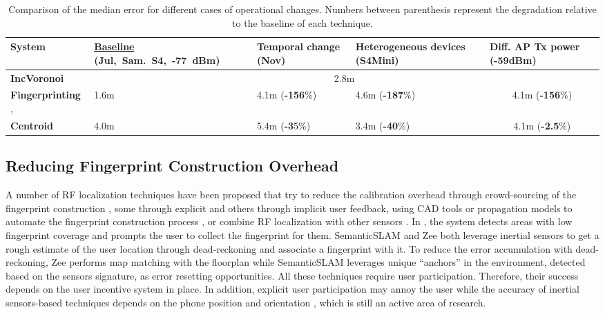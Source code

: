 \documentclass[conference]{IEEEtran}
\begin{document}
\begin{table*}[!t]
\centering
\begin{tabular}{|l|p{1.55in}||p{1.2in}|p{1.5in}|p{0.9in}|} \hline
\textbf{System}&\centering \textbf{\normalsize{\underline{Baseline}} \mbox{\small (Jul, Sam. S4, -77 dBm)}}&\centering  \textbf{Temporal change (Nov)}&\centering \textbf{Heterogeneous devices (S4Mini)}& \textbf{Diff. AP Tx power \mbox{\hspace{7mm}(-59dBm)}}\\ \hline \hline
\textbf{IncVoronoi}&\multicolumn{4}{c|}{2.8m}\\ \hline
\textbf{Fingerprinting} \cite{youssef2005horus},\cite{7103024}&\centering 1.6m&\centering  4.1m (\textbf{\textbf{-156}}\%)&\centering  4.6m (\textbf{\textbf{-187}}\%)&\multicolumn{1}{c|}{4.1m (\textbf{-156}\%)}\\ \hline
\textbf{Centroid} \cite{blumenthal2007weighted}&\centering 4.0m&\centering 5.4m (\textbf{-3}5\%)&\centering 3.4m (\textbf{-40}\%)&\multicolumn{1}{c|}{4.1m (\textbf{-2.5}\%)}\\ \hline
\end{tabular}
\caption{Comparison of the median error for different cases of operational changes. Numbers between parenthesis represent the degradation relative to the baseline of each technique.}
\label{tab:cdfTimeComp}
\end{table*}

\subsection{Reducing Fingerprint Construction Overhead}
A number of RF localization techniques have been proposed that try to reduce the calibration overhead through crowd-sourcing of the fingerprint construction \cite{abdelnassersemanticslam,elhamshary2016transitlabel,aly2014map++,elhamshary2015semsense,aly2015lanequest,aly2013dejavu
}, some through explicit \cite{organic} and others through implicit \cite{abdelnassersemanticslam,wang2012no,rai2012zee,aly2015lanequest,aly2013dejavu
} user feedback, using CAD tools or propagation models to automate the fingerprint construction process \cite{RADAR00,ARIADNE,aroma}, or combine RF localization with other sensors \cite{abdelnassersemanticslam,wang2012no,jiang2012ariel}. In \cite{organic}, the system detects areas with low fingerprint coverage and prompts the user to collect the fingerprint for them.
 SemanticSLAM \cite{wang2012no,abdelnassersemanticslam} and Zee \cite{rai2012zee} both leverage inertial sensors to get a rough estimate of the user location through dead-reckoning and associate a fingerprint with it. To reduce the error accumulation with dead-reckoning, Zee performs map matching with the floorplan while SemanticSLAM leverages unique ``anchors'' in the environment, detected based on the sensors signature, as error resetting opportunities. 
All these techniques require user participation. Therefore, their success depends on the user incentive system in place. In addition, explicit user participation may annoy the user while the accuracy of inertial sensors-based techniques depends on the  phone position and orientation \cite{mohssen2014s}, which is still an active area of research.
\end{document}
